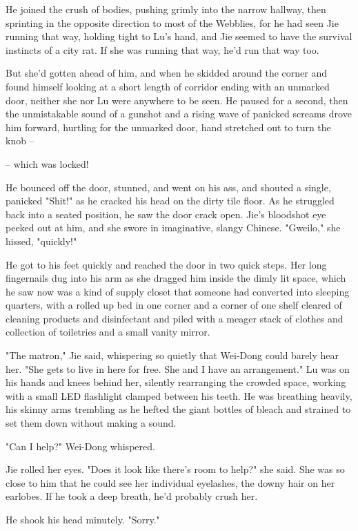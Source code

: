 He joined the crush of bodies, pushing grimly into the narrow
hallway, then sprinting in the opposite direction to most of the
Webblies, for he had seen Jie running that way, holding tight to
Lu's hand, and Jie seemed to have the survival instincts of a city
rat. If she was running that way, he'd run that way too.

But she'd gotten ahead of him, and when he skidded around the
corner and found himself looking at a short length of corridor
ending with an unmarked door, neither she nor Lu were anywhere to
be seen. He paused for a second, then the unmistakable sound of a
gunshot and a rising wave of panicked screams drove him forward,
hurtling for the unmarked door, hand stretched out to turn the knob
--

-- which was locked!

He bounced off the door, stunned, and went on his ass, and shouted
a single, panicked "Shit!" as he cracked his head on the dirty tile
floor. As he struggled back into a seated position, he saw the door
crack open. Jie's bloodshot eye peeked out at him, and she swore in
imaginative, slangy Chinese. "Gweilo," she hissed, "quickly!"

He got to his feet quickly and reached the door in two quick steps.
Her long fingernails dug into his arm as she dragged him inside the
dimly lit space, which he saw now was a kind of supply closet that
someone had converted into sleeping quarters, with a rolled up bed
in one corner and a corner of one shelf cleared of cleaning
products and disinfectant and piled with a meager stack of clothes
and collection of toiletries and a small vanity mirror.

"The matron," Jie said, whispering so quietly that Wei-Dong could
barely hear her. "She gets to live in here for free. She and I have
an arrangement." Lu was on his hands and knees behind her, silently
rearranging the crowded space, working with a small LED flashlight
clamped between his teeth. He was breathing heavily, his skinny
arms trembling as he hefted the giant bottles of bleach and
strained to set them down without making a sound.

"Can I help?" Wei-Dong whispered.

Jie rolled her eyes. "Does it look like there's room to help?" she
said. She was so close to him that he could see her individual
eyelashes, the downy hair on her earlobes. If he took a deep
breath, he'd probably crush her.

He shook his head minutely. "Sorry."

